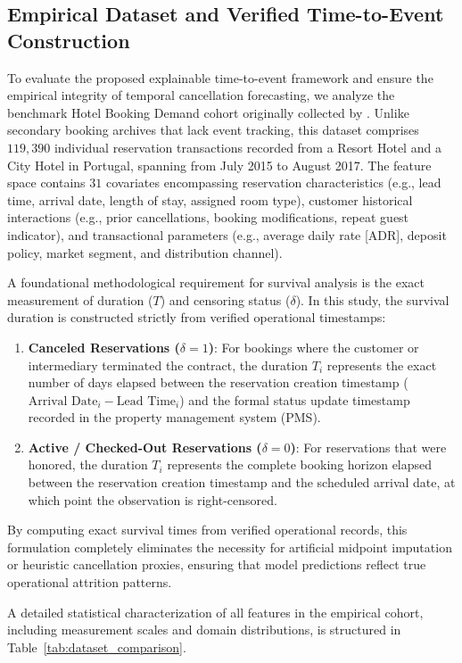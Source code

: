 \documentclass[pdflatex,iicol,sn-mathphys-ay]{sn-jnl}
\theoremstyle{thmstyleone}%
\theoremstyle{thmstyletwo}%
\theoremstyle{thmstylethree}%
\begin{document}
\subsection{Empirical Dataset and Verified Time-to-Event Construction}
\label{sec:dataset}

To evaluate the proposed explainable time-to-event framework and ensure the empirical integrity of temporal cancellation forecasting, we analyze the benchmark Hotel Booking Demand cohort originally collected by \cite{antonio2019data}. Unlike secondary booking archives that lack event tracking, this dataset comprises $119{,}390$ individual reservation transactions recorded from a Resort Hotel and a City Hotel in Portugal, spanning from July 2015 to August 2017. The feature space contains $31$ covariates encompassing reservation characteristics (e.g., lead time, arrival date, length of stay, assigned room type), customer historical interactions (e.g., prior cancellations, booking modifications, repeat guest indicator), and transactional parameters (e.g., average daily rate [ADR], deposit policy, market segment, and distribution channel).

A foundational methodological requirement for survival analysis is the exact measurement of duration ($T$) and censoring status ($\delta$). In this study, the survival duration is constructed strictly from verified operational timestamps:
\begin{enumerate}
    \item \textbf{Canceled Reservations ($\delta = 1$)}: For bookings where the customer or intermediary terminated the contract, the duration $T_i$ represents the exact number of days elapsed between the reservation creation timestamp ($\text{Arrival Date}_i - \text{Lead Time}_i$) and the formal status update timestamp recorded in the property management system (PMS).
    \item \textbf{Active / Checked-Out Reservations ($\delta = 0$)}: For reservations that were honored, the duration $T_i$ represents the complete booking horizon elapsed between the reservation creation timestamp and the scheduled arrival date, at which point the observation is right-censored.
\end{enumerate}
By computing exact survival times from verified operational records, this formulation completely eliminates the necessity for artificial midpoint imputation or heuristic cancellation proxies, ensuring that model predictions reflect true operational attrition patterns.

A detailed statistical characterization of all features in the empirical cohort, including measurement scales and domain distributions, is structured in Table~\ref{tab:dataset_comparison}.
\end{document}
